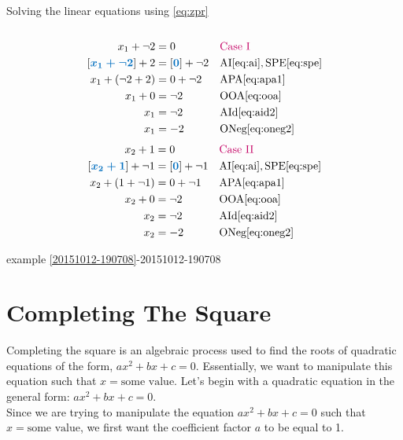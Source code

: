 \documentclass[20150903-160354-rs2.2-MarksMathNotebook.tex]{subfiles}
\begin{document}
\begin{example}[id:20151012-192313]
Solving the linear equations using  \eqref{eq:zpr} \\ \\
\begin{align*}
x_1+\neg 2& = 0  &&\text{\alert{Case I}} \\
\farg{x_1 +\neg 2}  + 2 &= \farg{0} + \neg 2 && \text{AI} \eqref{eq:ai},\text{SPE} \eqref{eq:spe}  \\
x_1+(\neg 2 + 2) &= 0 + \neg 2 && \text{APA} \eqref{eq:apa1} \\
x_1+0 &= \neg 2 && \text{OOA} \eqref{eq:ooa} \\
x_1&= \neg 2 && \text{AId} \eqref{eq:aid2} \\
x_1 &= -2 && \text{ONeg} \eqref{eq:oneg2} 
\end{align*}
\vspace{-0.5cm}
\begin{align*}
x_2+1 &= 0  &&\text{\alert{Case II}} \\
\farg{x_2+1} + \neg 1 &= \farg{0} + \neg 1 && \text{AI} \eqref{eq:ai},\text{SPE} \eqref{eq:spe}  \\
x_2 + (1 + \neg 1) &= 0+ \neg 1 && \text{APA} \eqref{eq:apa1} \\
x_2 + 0 &= \neg 2 && \text{OOA} \eqref{eq:ooa} \\
x_2 &= \neg 2 && \text{AId} \eqref{eq:aid2} \\
x_2 &= -2 && \text{ONeg} \eqref{eq:oneg2} 
\end{align*}

\qdepend

\qdependlist
example \ref{20151012-190708}-20151012-190708

\end{example}

\section{Completing The Square}

Completing the square is an algebraic process used to find the roots of quadratic equations of the form, $ax^2+bx+c=0$.   Essentially, we want to manipulate this equation such that $x=\text{some value}$.  Let's begin with a quadratic equation in the general form: $ax^2+bx+c=0$.\\

Since we are trying to manipulate the equation  $ax^2+bx+c=0$ such that $x=\text{some value}$, we first want the coefficient factor $a$ to be equal to 1.
\end{document}
